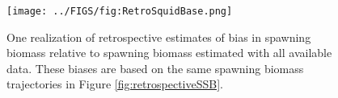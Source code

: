
\begin{figure}[!tbh]
	\begin{center}
		\texttt{[image: ../FIGS/fig:RetroSquidBase.png]}
	\end{center}
	\caption{One realization of retrospective estimates of bias in spawning biomass relative to spawning biomass estimated with all available data.  These biases are based on the same spawning biomass trajectories in Figure \ref{fig:retrospectiveSSB}.}
	\label{fig:retrosquidbase}
\end{figure}





